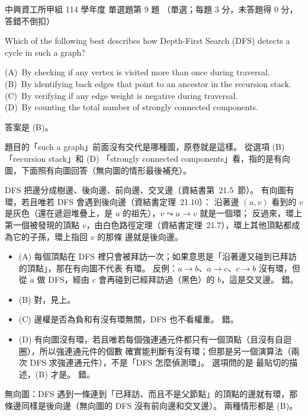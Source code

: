 \begin{pastexam}[label={px:nchu-114-dsa-09}]{中興資工所甲組 114 學年度 單選題第 9 題}
（單選；每題 3 分，未答題得 0 分，答錯不倒扣）

Which of the following best describes how Depth-First Search (DFS) detects a cycle in such a graph?

(A)~By checking if any vertex is visited more than once during traversal.\\
(B)~By identifying back edges that point to an ancestor in the recursion stack.\\
(C)~By verifying if any edge weight is negative during traversal.\\
(D)~By counting the total number of strongly connected components.
\end{pastexam}

\begin{pastsoln}
答案是 (B)。

題目的「such a graph」前面沒有交代是哪種圖，原卷就是這樣。 從選項 (B)「recursion stack」和 (D)
「strongly connected components」看，指的是有向圖，下面照有向圖回答（無向圖的情形最後補充）。

DFS 把邊分成樹邊、後向邊、前向邊、交叉邊（資結書第~21.5~節）。 有向圖有環，若且唯若 DFS 會遇到後向邊（資結書定理~21.10）：
沿著邊 $(u, v)$ 看到的 $v$ 是灰色（還在遞迴堆疊上，是 $u$ 的祖先），$v \leadsto u \to v$ 就是一個環；
反過來，環上第一個被發現的頂點 $v$，由白色路徑定理（資結書定理~21.7），環上其他頂點都成為它的子孫，環上指回 $v$ 的那條
邊就是後向邊。
\begin{itemize}
\item (A) 每個頂點在 DFS 裡只會被拜訪一次；如果意思是「沿著邊又碰到已拜訪的頂點」，那在有向圖不代表
有環。 反例：$a \to b$、$a \to c$、$c \to b$ 沒有環，但從 $a$ 做 DFS，經由 $c$ 會再碰到已經拜訪過（黑色）的
$b$，這是交叉邊。 錯。
\item (B) 對，見上。
\item (C) 邊權是否為負和有沒有環無關，DFS 也不看權重。 錯。
\item (D) 有向圖沒有環，若且唯若每個強連通元件都只有一個頂點（且沒有自迴圈），所以強連通元件的個數
確實能判斷有沒有環；但那是另一個演算法（兩次 DFS 求強連通元件），不是「DFS 怎麼偵測環」。 選項問的是
最貼切的描述，(B) 才是。 錯。
\end{itemize}
無向圖：DFS 遇到一條連到「已拜訪、而且不是父節點」的頂點的邊就有環，那條邊同樣是後向邊（無向圖的 DFS
沒有前向邊和交叉邊）。 兩種情形都是 (B)。
\end{pastsoln}
